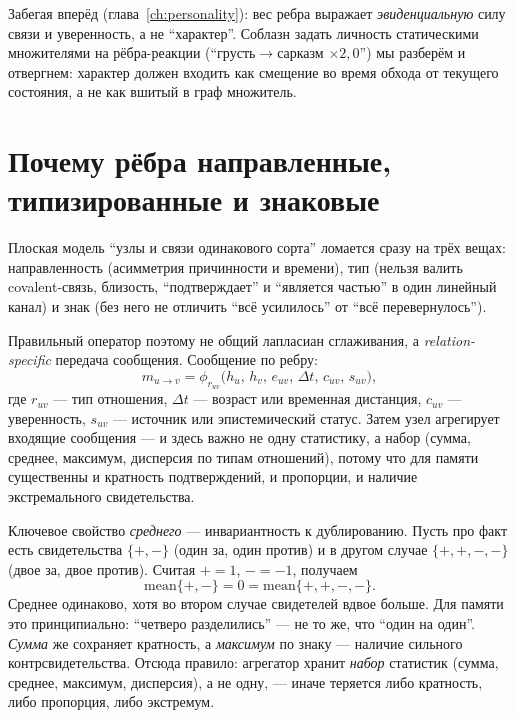 \begin{intuition}
Забегая вперёд (глава~\ref{ch:personality}): вес ребра выражает
\emph{эвиденциальную} силу связи и уверенность, а не ``характер''. Соблазн
задать личность статическими множителями на рёбра-реакции
(``грусть$\to$сарказм $\times 2{,}0$'') мы разберём и отвергнем: характер
должен входить как смещение во время обхода от текущего состояния, а не как
вшитый в граф множитель.
\end{intuition}

\section{Почему рёбра направленные, типизированные и знаковые}

Плоская модель ``узлы и связи одинакового сорта'' ломается сразу на трёх
вещах: направленность (асимметрия причинности и времени), тип (нельзя валить
covalent-связь, близость, ``подтверждает'' и ``является частью'' в один
линейный канал) и знак (без него не отличить ``всё усилилось'' от ``всё
перевернулось'').

Правильный оператор поэтому не общий лапласиан сглаживания, а
\emph{relation-specific} передача сообщения. Сообщение по ребру:
\begin{equation}
m_{u \to v} = \phi_{r_{uv}}\!\big(h_u,\, h_v,\, e_{uv},\, \Delta t,\, c_{uv},\, s_{uv}\big),
\label{eq:message}
\end{equation}
где $r_{uv}$ --- тип отношения, $\Delta t$ --- возраст или временная
дистанция, $c_{uv}$ --- уверенность, $s_{uv}$ --- источник или эпистемический
статус. Затем узел агрегирует входящие сообщения --- и здесь важно не одну
статистику, а набор (сумма, среднее, максимум, дисперсия по типам отношений),
потому что для памяти существенны и кратность подтверждений, и пропорции, и
наличие экстремального свидетельства.

\begin{workedbox}
Ключевое свойство \emph{среднего} --- инвариантность к дублированию. Пусть про
факт есть свидетельства $\{+, -\}$ (один за, один против) и в другом случае
$\{+, +, -, -\}$ (двое за, двое против). Считая $+ = 1$, $- = -1$, получаем
\[
\mathrm{mean}\{+, -\} = 0 = \mathrm{mean}\{+, +, -, -\}.
\]
Среднее одинаково, хотя во втором случае свидетелей вдвое больше. Для памяти
это принципиально: ``четверо разделились'' --- не то же, что ``один на один''.
\emph{Сумма} же сохраняет кратность, а \emph{максимум} по знаку --- наличие
сильного контрсвидетельства. Отсюда правило: агрегатор хранит \emph{набор}
статистик (сумма, среднее, максимум, дисперсия), а не одну, --- иначе
теряется либо кратность, либо пропорция, либо экстремум.
\end{workedbox}

